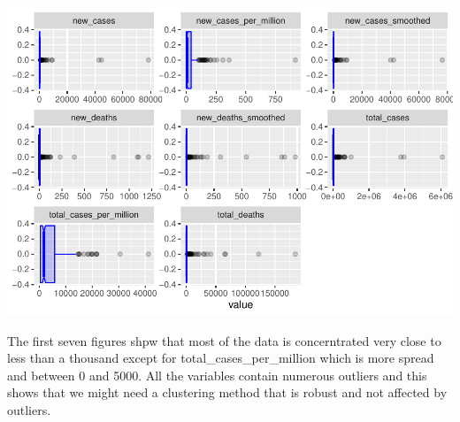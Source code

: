 \documentclass[
]{article}
\newenvironment{Shaded}{\begin{snugshade}}{\end{snugshade}}
\newcommand{\CommentTok}[1]{\textcolor[rgb]{0.56,0.35,0.01}{\textit{#1}}}
\newcommand{\DataTypeTok}[1]{\textcolor[rgb]{0.13,0.29,0.53}{#1}}
\newcommand{\DecValTok}[1]{\textcolor[rgb]{0.00,0.00,0.81}{#1}}
\newcommand{\FloatTok}[1]{\textcolor[rgb]{0.00,0.00,0.81}{#1}}
\newcommand{\KeywordTok}[1]{\textcolor[rgb]{0.13,0.29,0.53}{\textbf{#1}}}
\newcommand{\NormalTok}[1]{#1}
\newcommand{\OperatorTok}[1]{\textcolor[rgb]{0.81,0.36,0.00}{\textbf{#1}}}
\newcommand{\OtherTok}[1]{\textcolor[rgb]{0.56,0.35,0.01}{#1}}
\newcommand{\StringTok}[1]{\textcolor[rgb]{0.31,0.60,0.02}{#1}}
\begin{document}
\includegraphics{Assignment1_files/figure-latex/unnamed-chunk-2-1.pdf}

The first seven figures shpw that most of the data is concerntrated very close to less than a thousand except for total\_cases\_per\_million which is more spread and between 0 and 5000. All the variables contain numerous outliers and this shows that we might need a clustering method that is robust and not affected by outliers.

\begin{Shaded}
\end{Shaded}
\end{document}
